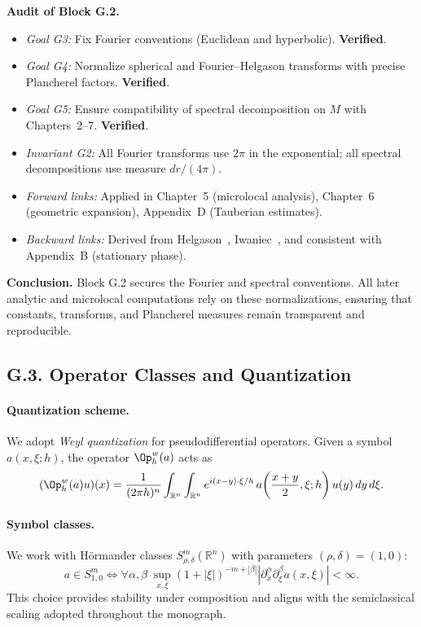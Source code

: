 \bigskip
\noindent\textbf{Audit of Block G.2.}
\begin{itemize}
    \item \emph{Goal G3:} Fix Fourier conventions (Euclidean and hyperbolic). \textbf{Verified}.
    \item \emph{Goal G4:} Normalize spherical and Fourier–Helgason transforms with precise Plancherel factors. \textbf{Verified}.
    \item \emph{Goal G5:} Ensure compatibility of spectral decomposition on $M$ with Chapters~2–7. \textbf{Verified}.
    \item \emph{Invariant G2:} All Fourier transforms use $2\pi$ in the exponential; all spectral decompositions use measure $dr/(4\pi)$.  
    \item \emph{Forward links:} Applied in Chapter~5 (microlocal analysis), Chapter~6 (geometric expansion), Appendix~D (Tauberian estimates).  
    \item \emph{Backward links:} Derived from Helgason~\cite{Helgason}, Iwaniec~\cite{Iwaniec2002}, and consistent with Appendix~B (stationary phase).  
\end{itemize}

\bigskip
\noindent\textbf{Conclusion.}  
Block G.2 secures the Fourier and spectral conventions. All later analytic and microlocal computations rely on these normalizations, ensuring that constants, transforms, and Plancherel measures remain transparent and reproducible.

\subsection*{G.3. Operator Classes and Quantization}
\label{appG:pdo}

\paragraph{Quantization scheme.}  
We adopt \emph{Weyl quantization} for pseudodifferential operators.  
Given a symbol $a(x,\xi;h)$, the operator $\Op_h^w(a)$ acts as
\[
(\Op_h^w(a)u)(x) = \frac{1}{(2\pi h)^n} \int_{\mathbb{R}^n}\int_{\mathbb{R}^n}
   e^{i(x-y)\cdot \xi /h} \, a\!\left(\frac{x+y}{2}, \xi;h\right) u(y)\, dy\, d\xi.
\]

\paragraph{Symbol classes.}  
We work with H\"ormander classes $S^m_{\rho,\delta}(\mathbb{R}^n)$ with parameters $(\rho,\delta)=(1,0)$:
\[
a \in S^m_{1,0} \iff
\forall \alpha,\beta \; \sup_{x,\xi}
(1+|\xi|)^{-m+|\beta|} |\partial_x^\alpha \partial_\xi^\beta a(x,\xi)| < \infty.
\]
This choice provides stability under composition and aligns with the semiclassical scaling adopted throughout the monograph.


